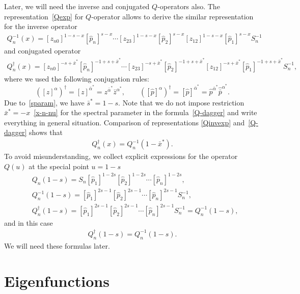 \documentclass[10pt,a4paper]{amsart}
\numberwithin{equation}{section}
\begin{document}
Later, we will need the inverse and conjugated $Q$-operators also.
The representation~\eqref{Qexp} for $Q$-operator allows to derive
the similar representation for the inverse operator
\begin{align}\label{Qinvexp}
Q^{-1}_n(x) = [z_{n0}]^{1-s-x} [\hat{p}_n]^{s-x}
\cdots
[z_{23}]^{1-s-x} [\hat{p}_2]^{s-x}
[z_{12}]^{1-s-x} [\hat{p}_1]^{s-x} S_n^{-1}
\end{align}
and conjugated operator
\begin{align}\label{Q-dagger}
Q^{\dagger}_n(x) = [z_{n0}]^{-s+\bar{x}^*} [\hat{p}_n]^{-1+s+\bar{x}^*}
\cdots
[z_{23}]^{-s+\bar{x}^*} [\hat{p}_2]^{-1+s+\bar{x}^*}
[z_{12}]^{-s+\bar{x}^*} [\hat{p}_1]^{-1+s+\bar{x}^*} S_n^{-1},
\end{align}
where we used the following conjugation rules:
\begin{equation*}
([z]^{\alpha})^{\dagger} =
[z]^{\bar{\alpha}^*} =
z^{\bar{\alpha}^*} \bar{z}^{\alpha^*},\qquad ([\hat{p}]^{\alpha})^{\dagger} =
[\hat{p}]^{\bar{\alpha}^*} = \hat{p}^{\bar{\alpha}^*}
\hat{\bar{p}}^{\alpha^*}.
\end{equation*}
Due to~\eqref{sparam}, we have $\bar{s}^* = 1-s$.
Note that we do not impose restriction $\bar{x}^* = -x$~\eqref{x-n-nu}
for the spectral parameter in the formula~\eqref{Q-dagger}
and write everything in general situation.
Comparison of representations
\eqref{Qinvexp} and~\eqref{Q-dagger} shows that
\begin{align} \label{QdagQinv}
Q^{\dagger}_n(x) = Q^{-1}_n(1-\bar{x}^*) .
\end{align}
To avoid misunderstanding, we collect explicit expressions for the operator $Q(u)$
at the special point $u = 1-s$
\begin{align*}
&
Q_n(1-s) = S_n
[\hat{p}_1]^{1-2s}
[\hat{p}_2]^{1-2s} \cdots [\hat{p}_n]^{1-2s} , \\
&
Q^{-1}_n(1-s) =
[\hat{p}_1]^{2s-1}
[\hat{p}_2]^{2s-1} \cdots [\hat{p}_n]^{2s-1} S^{-1}_n , \\
&
Q^{\dagger}_n(1-s) =
[\hat{p}_1]^{2s-1}
[\hat{p}_2]^{2s-1} \cdots [\hat{p}_n]^{2s-1} S^{-1}_n
= Q^{-1}_n(1-s) ,
\end{align*}
and in this case
\begin{align*}
Q^{\dagger}_n(1-s) = Q^{-1}_n(1-s) .
\end{align*}
We will need these formulas later.

\section{Eigenfunctions}\label{sect:eigen}
\end{document}
